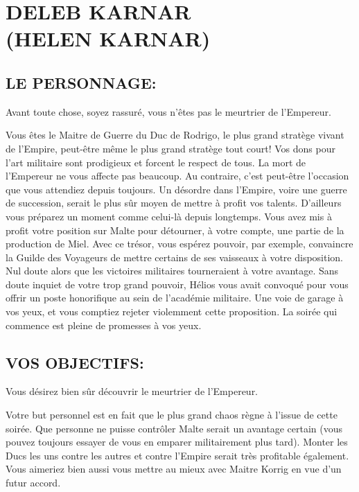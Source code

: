 \documentclass[14pt,twocolumn]{extarticle}
\begin{document}
\section{DELEB KARNAR\\(HELEN KARNAR)}

\subsection{LE PERSONNAGE:}

Avant toute chose, soyez rassuré, vous n'êtes pas le meurtrier de l'Empereur.

Vous êtes le Maitre de Guerre du Duc de Rodrigo, le plus grand stratège vivant
de l'Empire, peut-être même le plus grand stratège tout court! Vos dons pour
l'art militaire sont prodigieux et forcent le respect de tous. La mort de
l'Empereur ne vous affecte pas beaucoup. Au contraire, c'est peut-être
l'occasion que vous attendiez depuis toujours. Un désordre dans l'Empire, voire
une guerre de succession, serait le plus sûr moyen de mettre à profit vos
talents. D'ailleurs vous préparez un moment comme celui-là depuis longtemps.
Vous avez mis à profit votre position sur Malte pour détourner, à votre compte,
une partie de la production de Miel. Avec ce trésor, vous espérez pouvoir, par
exemple, convaincre la Guilde des Voyageurs de mettre certains de ses vaisseaux
à votre disposition. Nul doute alors que les victoires militaires tourneraient
à votre avantage. Sans doute inquiet de votre trop grand pouvoir, Hélios vous
avait convoqué pour vous \og offrir\fg{} un poste honorifique au sein de
l'académie militaire. Une voie de garage à vos yeux, et vous comptiez rejeter
violemment cette proposition. La soirée qui commence est pleine de promesses à
vos yeux.

\subsection{VOS OBJECTIFS:}

Vous désirez bien sûr découvrir le meurtrier de l'Empereur.

Votre but personnel est en fait que le plus grand chaos règne à l'issue de
cette soirée. Que personne ne puisse contrôler Malte serait un avantage certain
(vous pouvez toujours essayer de vous en emparer militairement plus tard).
Monter les Ducs les uns contre les autres et contre l'Empire serait très
profitable également. Vous aimeriez bien aussi vous mettre au mieux avec
Maitre Korrig en vue d'un futur accord.
\end{document}
